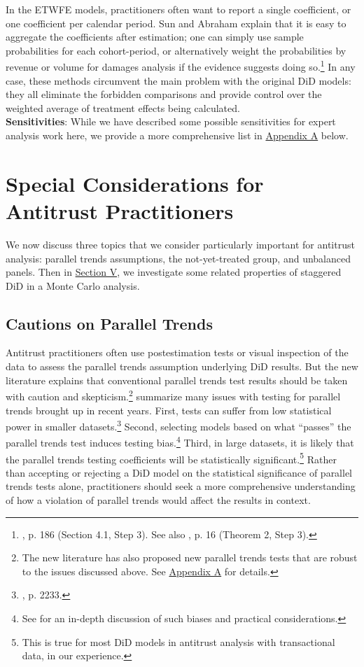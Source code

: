 \documentclass[12pt]{article}
\begin{document}
In the ETWFE models, practitioners often want to report a single coefficient, or one coefficient per calendar period. Sun and Abraham explain that it is easy to aggregate the coefficients after estimation; one can simply use sample probabilities for each cohort-period, or alternatively weight the probabilities by revenue or volume for damages analysis if the evidence suggests doing so.\footnote{\citet{sunabr2021a}, p. 186 (Section 4.1, Step 3). See also \citet{borusyak2024revisiting}, p. 16 (Theorem 2, Step 3).}  In any case, these methods circumvent the main problem with the original DiD models: they all eliminate the forbidden comparisons and provide control over the weighted average of treatment effects being calculated.
\\
\textbf{Sensitivities}: While we have described some possible sensitivities for expert analysis work here, we provide a more comprehensive list in  \hyperref[sec:appendixa]{Appendix A} below.
\section{Special Considerations for Antitrust Practitioners} \label{sec:antitrust}
We now discuss three topics that we consider particularly important for antitrust analysis: parallel trends assumptions, the not-yet-treated group, and unbalanced panels. Then in  \hyperref[sec:analysis]{Section V}, we investigate some related properties of staggered DiD in a Monte Carlo analysis.
\subsection{Cautions on Parallel Trends} \label{sec:parallel-trends}
Antitrust practitioners often use postestimation tests or visual inspection of the data to assess the parallel trends assumption underlying DiD results. But the new literature explains that conventional parallel trends test results should be taken with caution and skepticism.\footnote{The new literature has also proposed new parallel trends tests that are robust to the issues discussed above. See \hyperref[sec:appendixa]{Appendix A} for details.} \citet{roth2023s} summarize many issues with testing for parallel trends brought up in recent years. First, tests can suffer from low statistical power in smaller datasets.\footnote{\citet{roth2023s}, p. 2233.}  Second, selecting models based on what “passes” the parallel trends test induces testing bias.\footnote{See \citet{roth2022a} for an in-depth discussion of such biases and practical considerations.}  Third, in large datasets, it is likely that the parallel trends testing coefficients will be statistically significant.\footnote{This is true for most DiD models in antitrust analysis with transactional data, in our experience.} Rather than accepting or rejecting a DiD model on the statistical significance of parallel trends tests alone, practitioners should seek a more comprehensive understanding of how a violation of parallel trends would affect the results in context. 
\end{document}
